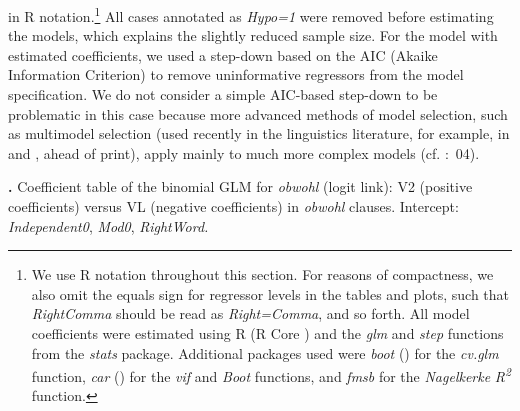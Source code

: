 \begin{styleMoutonTextBetweenExamples}
in R notation.\footnote{We use R notation throughout this section. For reasons of compactness, we also omit the equals sign for regressor levels in the tables and plots, such that \textit{RightComma} should be read as \textit{Right=Comma}, and so forth. All model coefficients were estimated using R (R Core \citealt{Team2013}) and the \textit{glm} and \textit{step} functions from the \textit{stats} package. Additional packages used were \textit{boot} (\citealt{CantyRipley2013}) for the \textit{cv.glm} function, \textit{car} (\citealt{FoxWeisberg2011}) for the \textit{vif} and \textit{Boot} functions, and \textit{fmsb} \citep{Nakazawa2014} for the \textit{Nagelkerke} \textit{R\textsuperscript{2}} function.} All cases annotated as \textit{Hypo=1} were removed before estimating the models, which explains the slightly reduced sample size. For the model with estimated coefficients, we used a step-down based on the AIC (Akaike Information Criterion) to remove uninformative regressors from the model specification. We do not consider a simple AIC-based step-down to be problematic in this case because more advanced methods of model selection, such as multimodel selection (used recently in the linguistics literature, for example, in \citealt{KupermanBresnan2012} and \citealt{BarthKapatsinski2014}, ahead of print), apply mainly to much more complex models (cf. \citealt{BurnhamAnderson2002}:~04).
\end{styleMoutonTextBetweenExamples}

\begin{styleMoutonText}
\textbf{.} Coefficient table of the binomial GLM for \textit{obwohl} (logit link): V2 (positive coefficients) versus VL (nega\-tive coefficients) in \textit{obwohl} clauses. Intercept: \textit{Independent0}, \textit{Mod0}, \textit{RightWord.}
\end{styleMoutonText}

\tablefirsthead{}

